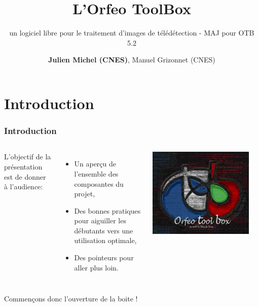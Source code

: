 \documentclass[8pt]{beamer}
\title{L'Orfeo ToolBox}
\subtitle{un logiciel libre pour le traitement d'images de télédétection - MAJ
  pour OTB 5.2}
\author{\textbf{Julien Michel (CNES)}, Manuel Grizonnet (CNES)}%
\date{}
\begin{document}
\begin{frame}
\titlepage
\end{frame}

\section{Introduction}

\begin{frame}
\frametitle{Introduction}
\begin{columns}
L'objectif de la présentation est de donner à l'audience:
\begin{itemize}
\item Un aperçu de l'ensemble des composantes du projet,
\item Des bonnes pratiques pour aiguiller les débutants vers une utilisation optimale,
\item Des pointeurs pour aller plus loin.
\end{itemize}
\includegraphics[width=0.9\textwidth]{images/LOGOTB_blackbox.png}
\end{columns}
\begin{center}
{\huge \color{red}{Orfeo ToolBox is not a black box \ldots}}

Commençons donc l'ouverture de la boite !
\end{center}

\end{frame}
\end{document}
